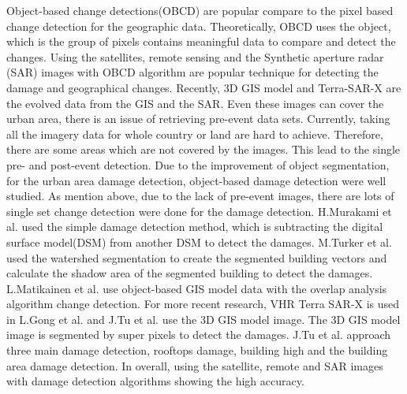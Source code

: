 \documentclass[runningheads,a4paper]{llncs}
\begin{document}
Object-based change detections(OBCD) are popular compare to the pixel based change detection for the geographic data. 
Theoretically, OBCD uses the object, which is the group of pixels contains meaningful data to compare and detect the changes.
Using the satellites, remote sensing and the Synthetic aperture radar (SAR) images with OBCD algorithm are popular technique for detecting the damage and geographical changes. 
Recently, 3D GIS model and Terra-SAR-X are the evolved data from the GIS and the SAR. 
Even these images can cover the urban area, there is an issue of retrieving pre-event data sets. Currently, taking all the imagery data for whole country or land are hard to achieve. Therefore, there are some areas which are not covered by the images. This lead to the single pre- and post-event detection.
Due to the improvement of object segmentation, for the urban area damage detection, object-based damage detection were well studied. 
As mention above, due to the lack of pre-event images,  there are lots of single set change detection were done for the damage detection. H.Murakami et al.\cite{murakami1999change} used the simple damage detection method, which is subtracting the digital surface model(DSM) from another DSM to detect the damages. M.Turker et al.\cite{turker2008building} used the watershed segmentation to create the segmented building vectors and calculate the shadow area of the segmented building to detect the damages. L.Matikainen et al.\cite{rs2051217} use object-based GIS model data with the overlap analysis algorithm change detection. For more recent research, VHR Terra SAR-X is used in L.Gong et al.\cite{gong2016earthquake} and J.Tu et al.\cite{tu2016automatic} use the 3D GIS model image. The 3D GIS model image is segmented by super pixels to detect the damages. J.Tu et al. approach three main damage detection, rooftops damage, building high and the building area damage detection. In overall, using the satellite, remote and SAR images with damage detection algorithms showing the high accuracy.


\end{document}
